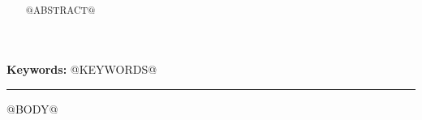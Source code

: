 \documentclass[11pt,a4paper]{article}
\title{\textbf{\papertitle}}
\author{\paperauthor \\ \small \paperaffiliation}
\date{\paperdate}
\makeatletter
\newcommand{\paperabstract}{@ABSTRACT@}
\newcommand{\paperkeywords}{@KEYWORDS@}
\makeatother
\begin{document}
\maketitle
\thispagestyle{fancy}
\begin{abstract}
\paperabstract
\end{abstract}
\noindent\textbf{Keywords:} \paperkeywords
\vspace{1em}
\hrule
\vspace{1em}
@BODY@


\end{document}

